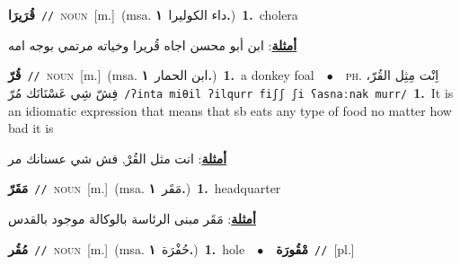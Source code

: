 \documentclass[10pt,a4paper,twoside]{article} %
\begin{document}
\begin{multicols}{2}
{\setlength\topsep{0pt}\textbf{\foreignlanguage{arabic}{قُرَيرَا}}\ {\color{gray}\texttt{//}\color{black}}\ \textsc{noun}\ [m.]\ \color{gray}(msa. \foreignlanguage{arabic}{داء الكوليرا}~\foreignlanguage{arabic}{\textbf{١.}})\color{black}\ \textbf{1.}~cholera\  \begin{flushright}\color{gray}\foreignlanguage{arabic}{\textbf{\underline{\foreignlanguage{arabic}{أمثلة}}}: ابن أبو محسن اجاه قُريرا وخياته مرتمي بوجه امه}\end{flushright}\color{black}} \vspace{2mm}

{\setlength\topsep{0pt}\textbf{\foreignlanguage{arabic}{قُرّ}}\ {\color{gray}\texttt{//}\color{black}}\ \textsc{noun}\ [m.]\ \color{gray}(msa. \foreignlanguage{arabic}{ابن الحمار}~\foreignlanguage{arabic}{\textbf{١.}})\color{black}\ \textbf{1.}~a donkey foal\ \ $\bullet$\ \ \textsc{ph.} \color{gray} \foreignlanguage{arabic}{اِنْت مِثِل القُرّ، فِشّ شِي عَسْنَانَك مُرّ}\color{black}\ {\color{gray}\texttt{/{\sffamily ʔinta miθil ʔilqurr fiʃʃ ʃi ʕasnaːnak murr}/}\color{black}}\ \textbf{1.}~It is an idiomatic expression that means that sb eats any type of food no matter how bad it is\  \begin{flushright}\color{gray}\foreignlanguage{arabic}{\textbf{\underline{\foreignlanguage{arabic}{أمثلة}}}: انت مثل القُرْ, فش شي عسنانك مر}\end{flushright}\color{black}} \vspace{2mm}

{\setlength\topsep{0pt}\textbf{\foreignlanguage{arabic}{مَقَرّ}}\ {\color{gray}\texttt{//}\color{black}}\ \textsc{noun}\ [m.]\ \color{gray}(msa. \foreignlanguage{arabic}{مَقَر}~\foreignlanguage{arabic}{\textbf{١.}})\color{black}\ \textbf{1.}~headquarter\  \begin{flushright}\color{gray}\foreignlanguage{arabic}{\textbf{\underline{\foreignlanguage{arabic}{أمثلة}}}: مَقَر مبنى الرئاسة بالوكالة موجود بالقدس}\end{flushright}\color{black}} \vspace{2mm}

{\setlength\topsep{0pt}\textbf{\foreignlanguage{arabic}{مُقُر}}\ {\color{gray}\texttt{//}\color{black}}\ \textsc{noun}\ [m.]\ \color{gray}(msa. \foreignlanguage{arabic}{حُفْرَة}~\foreignlanguage{arabic}{\textbf{١.}})\color{black}\ \textbf{1.}~hole\ \ $\bullet$\ \ \setlength\topsep{0pt}\textbf{\foreignlanguage{arabic}{مْقُورَة}}\ {\color{gray}\texttt{//}\color{black}}\ [pl.]\ } \vspace{2mm}


\end{multicols}
\end{document}
